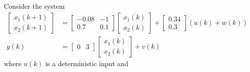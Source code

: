\item

Consider the system
\begin{align*}
    \begin{bmatrix}
            x_1(k+1) \\
            x_2(k+1)
        \end{bmatrix} & = \begin{bmatrix}
            -0.08 & -1 \\
            0.7 & 0.1
        \end{bmatrix} \begin{bmatrix}
            x_1(k) \\
            x_2(k)
        \end{bmatrix} + \begin{bmatrix}
            0.34 \\
            0.3
        \end{bmatrix} (u(k) + w(k)) \\
    y(k) & = \begin{bmatrix}
            0 & 3
        \end{bmatrix} \begin{bmatrix}
            x_1(k) \\
            x_2(k)
        \end{bmatrix} + v(k)
\end{align*}
where $u(k)$ is a deterministic input and
